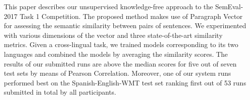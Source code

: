 This paper describes our unsupervised knowledge-free approach to the SemEval-2017 Task 1 Competition. The proposed method makes use of Paragraph Vector for assessing the semantic similarity between pairs of sentences. We experimented with various dimensions of the vector and three state-of-the-art similarity metrics. Given a cross-lingual task, we trained models corresponding to its two languages and combined the models by averaging the similarity scores. The results of our submitted runs are above the median scores for five out of seven test sets by means of Pearson Correlation. Moreover, one of our system runs performed best on the Spanish-English-WMT test set ranking first out of 53 runs submitted in total by all participants.
